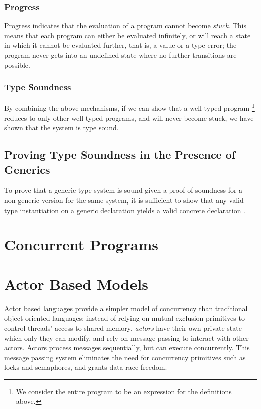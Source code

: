 \subsubsection{Progress}

Progress indicates that the evaluation of a program cannot become \textit{stuck}. This means that each program can either be evaluated infinitely, or will reach a state in which it cannot be evaluated further, that is, a value or a type error; the program never gets into an undefined state where no further transitions are possible.

\subsubsection{Type Soundness}

By combining the above mechanisms, if we can show that a well-typed program \footnote{We consider the entire program to be an expression for the definitions above.} reduces to only other well-typed programs, and will never become stuck, we have shown that the system is type sound.

\subsection{Proving Type Soundness in the Presence of Generics}

To prove that a generic type system is sound given a proof of soundness for a non-generic version for the same system, it is sufficient to show that any valid type instantiation on a generic declaration yields a valid concrete declaration \cite{Gordon2012} .

\section{Concurrent Programs} \label{conrules}

\section{Actor Based Models}

Actor based languages \cite{Hewitt1973} provide a simpler model of concurrency than traditional object-oriented languages; instead of relying on mutual exclusion primitives to control threads' access to shared memory, \textit{actors} have their own private state which only they can modify, and rely on message passing to interact with other actors. Actors process messages sequentially, but can execute concurrently. This message passing system eliminates the need for concurrency primitives such as locks and semaphores, and grants data race freedom.

